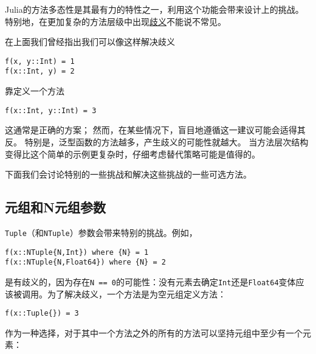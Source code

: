 Julia的方法多态性是其最有力的特性之一，利用这个功能会带来设计上的挑战。特别地，在更加复杂的方法层级中出现\hyperlink{1524461975045594238}{歧义}不能说不常见。



在上面我们曾经指出我们可以像这样解决歧义




\begin{verbatim}
f(x, y::Int) = 1
f(x::Int, y) = 2
\end{verbatim}



靠定义一个方法




\begin{verbatim}
f(x::Int, y::Int) = 3
\end{verbatim}



这通常是正确的方案； 然而，在某些情况下，盲目地遵循这一建议可能会适得其反。 特别是，泛型函数的方法越多，产生歧义的可能性就越大。 当方法层次结构变得比这个简单的示例更复杂时，仔细考虑替代策略可能是值得的。



下面我们会讨论特别的一些挑战和解决这些挑战的一些可选方法。



\hypertarget{17193104641044635373}{}


\subsection{元组和N元组参数}



\texttt{Tuple}（和\texttt{NTuple}）参数会带来特别的挑战。例如，




\begin{verbatim}
f(x::NTuple{N,Int}) where {N} = 1
f(x::NTuple{N,Float64}) where {N} = 2
\end{verbatim}



是有歧义的，因为存在\texttt{N == 0}的可能性：没有元素去确定\texttt{Int}还是\texttt{Float64}变体应该被调用。为了解决歧义，一个方法是为空元组定义方法：




\begin{verbatim}
f(x::Tuple{}) = 3
\end{verbatim}



作为一种选择，对于其中一个方法之外的所有的方法可以坚持元组中至少有一个元素：




